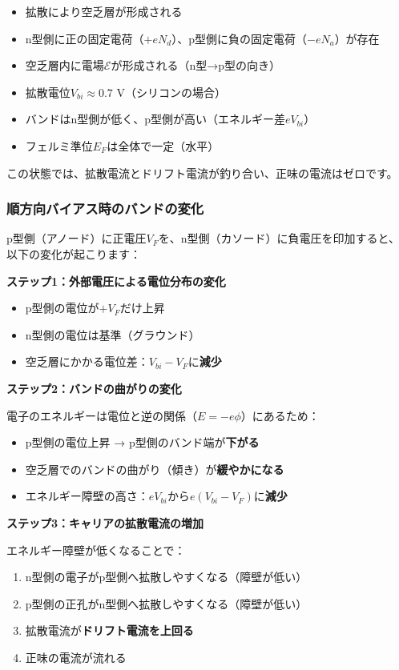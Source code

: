 \begin{itemize}
\item 拡散により空乏層が形成される
\item n型側に正の固定電荷（$+eN_d$）、p型側に負の固定電荷（$-eN_a$）が存在
\item 空乏層内に電場$\mathcal{E}$が形成される（n型→p型の向き）
\item 拡散電位$V_{bi} \approx 0.7$ V（シリコンの場合）
\item バンドはn型側が低く、p型側が高い（エネルギー差$eV_{bi}$）
\item フェルミ準位$E_F$は全体で一定（水平）
\end{itemize}

この状態では、拡散電流とドリフト電流が釣り合い、正味の電流はゼロです。

\subsubsection{順方向バイアス時のバンドの変化}

p型側（アノード）に正電圧$V_F$を、n型側（カソード）に負電圧を印加すると、以下の変化が起こります：

\textbf{ステップ1：外部電圧による電位分布の変化}

\begin{itemize}
\item p型側の電位が$+V_F$だけ上昇
\item n型側の電位は基準（グラウンド）
\item 空乏層にかかる電位差：$V_{bi} - V_F$に\textbf{減少}
\end{itemize}

\textbf{ステップ2：バンドの曲がりの変化}

電子のエネルギーは電位と逆の関係（$E = -e\phi$）にあるため：

\begin{itemize}
\item p型側の電位上昇 → p型側のバンド端が\textbf{下がる}
\item 空乏層でのバンドの曲がり（傾き）が\textbf{緩やかになる}
\item エネルギー障壁の高さ：$eV_{bi}$から$e(V_{bi} - V_F)$に\textbf{減少}
\end{itemize}

\textbf{ステップ3：キャリアの拡散電流の増加}

エネルギー障壁が低くなることで：

\begin{enumerate}
\item n型側の電子がp型側へ拡散しやすくなる（障壁が低い）
\item p型側の正孔がn型側へ拡散しやすくなる（障壁が低い）
\item 拡散電流が\textbf{ドリフト電流を上回る}
\item 正味の電流が流れる
\end{enumerate}

